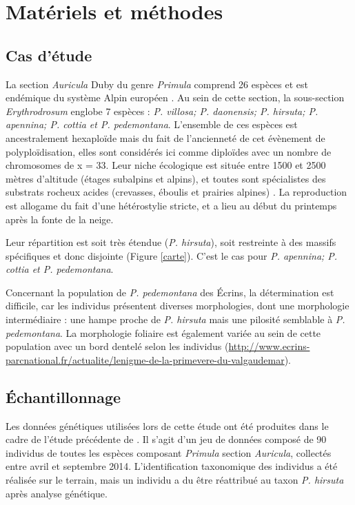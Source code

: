 \section{Matériels et méthodes}

\subsection{Cas d'étude}

La section \textit{Auricula} Duby du genre \textit{Primula} comprend 26 espèces et est endémique du système Alpin européen \citep{Ozenda1995}. Au sein de cette section, la sous-section \textit{Erythrodrosum} englobe 7 espèces : \textit{P. villosa; P. daonensis; P. hirsuta; P. apennina; P. cottia et P. pedemontana}. L'ensemble de ces espèces est ancestralement hexaploïde mais du fait de l'ancienneté de cet évènement de polyploïdisation, elles sont considérés ici comme diploïdes avec un nombre de chromosomes de x = 33. Leur niche écologique est située entre 1500 et 2500 mètres d'altitude (étages subalpins et alpins), et toutes sont spécialistes des substrats rocheux acides (crevasses, éboulis et prairies alpines) \citep{Zhang2004}. La reproduction est allogame du fait d'une hétérostylie stricte, et a lieu au début du printemps après la fonte de la neige.

Leur répartition est soit très étendue (\textit{P. hirsuta}), soit restreinte à des massifs spécifiques et donc disjointe (Figure \ref{carte}). C'est le cas pour \textit{P. apennina; P. cottia et P. pedemontana}.

Concernant la population de \textit{P. pedemontana} des Écrins, la détermination est difficile, car les individus présentent diverses morphologies, dont une morphologie intermédiaire : une hampe proche de \textit{P. hirsuta} mais une pilosité semblable à \textit{P. pedemontana}. La morphologie foliaire est également variée au sein de cette population avec un bord dentelé selon les individus (\url{http://www.ecrins-parcnational.fr/actualite/lenigme-de-la-primevere-du-valgaudemar}).

\subsection{Échantillonnage}

Les données génétiques utilisées lors de cette étude ont été produites dans le cadre de l'étude précédente de \citet{Boucher2016a}. Il s'agit d'un jeu de données composé de 90 individus de toutes les espèces composant \textit{Primula} section \textit{Auricula}, collectés entre avril et septembre 2014. L'identification taxonomique des individus a été réalisée sur le terrain, mais un individu a du être réattribué au taxon \textit{P. hirsuta} après analyse génétique.

